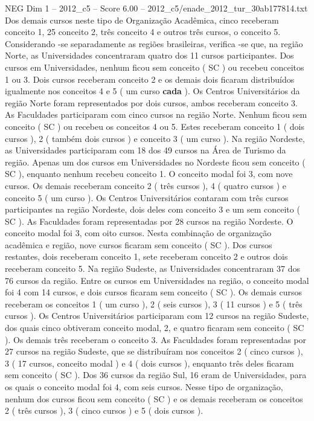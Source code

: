 \begin{textsample}{NEG Dim 1 – 2012\_c5 – Score 6.00 – 2012\_c5/enade\_2012\_tur\_30ab177814.txt}
Dos demais cursos neste tipo de Organização Acadêmica, cinco receberam conceito 1, 25 conceito 2, três conceito 4 e outros três cursos, o conceito 5.
Considerando -se separadamente as regiões brasileiras, verifica -se que, na região Norte, as Universidades concentraram quatro dos 11 cursos participantes.
Dos cursos em Universidades, nenhum ficou sem conceito ( SC ) ou recebeu conceitos 1 ou 3.
Dois cursos receberam conceito 2 e os demais dois ficaram distribuídos igualmente nos conceitos 4 e 5 ( um curso \textbf{cada} ).
Os Centros Universitários da região Norte foram representados por dois cursos, ambos receberam conceito 3.
As Faculdades participaram com cinco cursos na região Norte.
Nenhum ficou sem conceito ( SC ) ou recebeu os conceitos 4 ou 5.
Estes receberam conceito 1 ( dois cursos ), 2 ( também dois cursos ) e conceito 3 ( um curso ).
Na região Nordeste, as Universidades participaram com 18 dos 49 cursos na Área de Turismo da região.
Apenas um dos cursos em Universidades no Nordeste ficou sem conceito ( SC ), enquanto nenhum recebeu conceito 1.
O conceito modal foi 3, com nove cursos.
Os demais receberam conceito 2 ( três cursos ), 4 ( quatro cursos ) e conceito 5 ( um curso ).
Os Centros Universitários contaram com três cursos participantes na região Nordeste, dois deles com conceito 3 e um sem conceito ( SC ).
As Faculdades foram representadas por 28 cursos na região Nordeste.
O conceito modal foi 3, com oito cursos.
Nesta combinação de organização acadêmica e região, nove cursos ficaram sem conceito ( SC ).
Dos cursos restantes, dois receberam conceito 1, sete receberam conceito 2 e outros dois receberam conceito 5.
Na região Sudeste, as Universidades concentraram 37 dos 76 cursos da região.
Entre os cursos em Universidades na região, o conceito modal foi 4 com 14 cursos, e dois cursos ficaram sem conceito ( SC ).
Os demais cursos receberam os conceitos 1 ( um curso ), 2 ( seis cursos ), 3 ( 11 cursos ) e 5 ( três cursos ).
Os Centros Universitários participaram com 12 cursos na região Sudeste, dos quais cinco obtiveram conceito modal, 2, e quatro ficaram sem conceito ( SC ).
Os demais três receberam o conceito 3.
As Faculdades foram representadas por 27 cursos na região Sudeste, que se distribuíram nos conceitos 2 ( cinco cursos ), 3 ( 17 cursos, conceito modal ) e 4 ( dois cursos ), enquanto três deles ficaram sem conceito ( SC ).
Dos 36 cursos da região Sul, 16 eram de Universidades, para os quais o conceito modal foi 4, com seis cursos.
Nesse tipo de organização, nenhum dos cursos ficou sem conceito ( SC ) e os demais receberam os conceitos 2 ( três cursos ), 3 ( cinco cursos ) e 5 ( dois cursos ).

\end{textsample}
